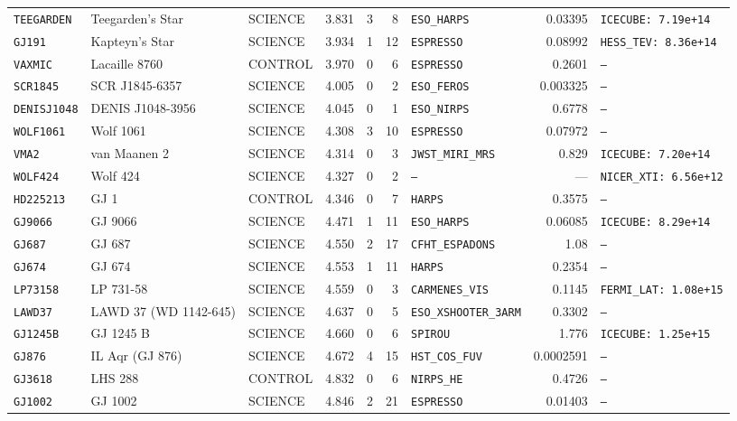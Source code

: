 \documentclass[twocolumn,10pt]{article}
\begin{document}
\begin{table}[!ht]
{\begin{tabular}{llllrrlrl}
\texttt{TEEGARDEN} & Teegarden's Star & SCIENCE & 3.831 & 3 & 8 & \texttt{ESO\_HARPS} & 0.03395 & \texttt{ICECUBE: 7.19e+14} \\
\texttt{GJ191} & Kapteyn's Star & SCIENCE & 3.934 & 1 & 12 & \texttt{ESPRESSO} & 0.08992 & \texttt{HESS\_TEV: 8.36e+14} \\
\texttt{VAXMIC} & Lacaille 8760 & CONTROL & 3.970 & 0 & 6 & \texttt{ESPRESSO} & 0.2601 & \texttt{---} \\
\texttt{SCR1845} & SCR J1845-6357 & SCIENCE & 4.005 & 0 & 2 & \texttt{ESO\_FEROS} & 0.003325 & \texttt{---} \\
\texttt{DENISJ1048} & DENIS J1048-3956 & SCIENCE & 4.045 & 0 & 1 & \texttt{ESO\_NIRPS} & 0.6778 & \texttt{---} \\
\texttt{WOLF1061} & Wolf 1061 & SCIENCE & 4.308 & 3 & 10 & \texttt{ESPRESSO} & 0.07972 & \texttt{---} \\
\texttt{VMA2} & van Maanen 2 & SCIENCE & 4.314 & 0 & 3 & \texttt{JWST\_MIRI\_MRS} & 0.829 & \texttt{ICECUBE: 7.20e+14} \\
\texttt{WOLF424} & Wolf 424 & SCIENCE & 4.327 & 0 & 2 & \texttt{---} & --- & \texttt{NICER\_XTI: 6.56e+12} \\
\texttt{HD225213} & GJ 1 & CONTROL & 4.346 & 0 & 7 & \texttt{HARPS} & 0.3575 & \texttt{---} \\
\texttt{GJ9066} & GJ 9066 & SCIENCE & 4.471 & 1 & 11 & \texttt{ESO\_HARPS} & 0.06085 & \texttt{ICECUBE: 8.29e+14} \\
\texttt{GJ687} & GJ 687 & SCIENCE & 4.550 & 2 & 17 & \texttt{CFHT\_ESPADONS} & 1.08 & \texttt{---} \\
\texttt{GJ674} & GJ 674 & SCIENCE & 4.553 & 1 & 11 & \texttt{HARPS} & 0.2354 & \texttt{---} \\
\texttt{LP73158} & LP 731-58 & SCIENCE & 4.559 & 0 & 3 & \texttt{CARMENES\_VIS} & 0.1145 & \texttt{FERMI\_LAT: 1.08e+15} \\
\texttt{LAWD37} & LAWD 37 (WD 1142-645) & SCIENCE & 4.637 & 0 & 5 & \texttt{ESO\_XSHOOTER\_3ARM} & 0.3302 & \texttt{---} \\
\texttt{GJ1245B} & GJ 1245 B & SCIENCE & 4.660 & 0 & 6 & \texttt{SPIROU} & 1.776 & \texttt{ICECUBE: 1.25e+15} \\
\texttt{GJ876} & IL Aqr (GJ 876) & SCIENCE & 4.672 & 4 & 15 & \texttt{HST\_COS\_FUV} & 0.0002591 & \texttt{---} \\
\texttt{GJ3618} & LHS 288 & CONTROL & 4.832 & 0 & 6 & \texttt{NIRPS\_HE} & 0.4726 & \texttt{---} \\
\texttt{GJ1002} & GJ 1002 & SCIENCE & 4.846 & 2 & 21 & \texttt{ESPRESSO} & 0.01403 & \texttt{---} \\
\bottomrule
\end{tabular}%
}
\end{table}
\end{document}
